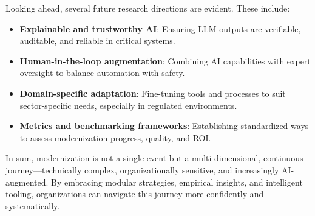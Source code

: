 \documentclass[12pt]{article}
\begin{document}
Looking ahead, several future research directions are evident. These include:
\begin{itemize}
    \item \textbf{Explainable and trustworthy AI}: Ensuring LLM outputs are verifiable, auditable, and reliable in critical systems.
    \item \textbf{Human-in-the-loop augmentation}: Combining AI capabilities with expert oversight to balance automation with safety.
    \item \textbf{Domain-specific adaptation}: Fine-tuning tools and processes to suit sector-specific needs, especially in regulated environments.
    \item \textbf{Metrics and benchmarking frameworks}: Establishing standardized ways to assess modernization progress, quality, and ROI.
\end{itemize}

In sum, modernization is not a single event but a multi-dimensional, continuous journey—technically complex, organizationally sensitive, and increasingly AI-augmented. By embracing modular strategies, empirical insights, and intelligent tooling, organizations can navigate this journey more confidently and systematically.
\end{document}
